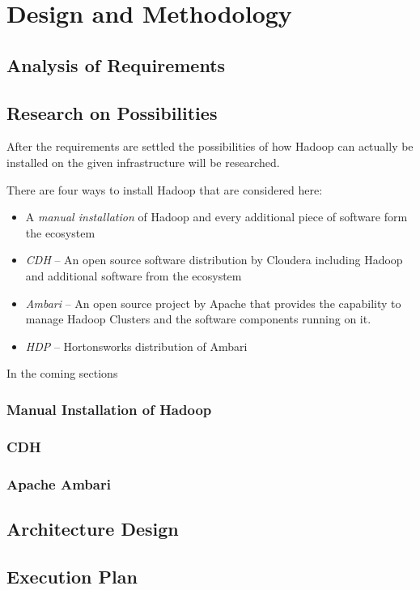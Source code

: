 \chapter{Design and Methodology}
\label{chap:design}

\section{Analysis of Requirements}

\section{Research on Possibilities}

After the requirements are settled
the possibilities of how Hadoop can actually be installed 
on the given infrastructure will be researched.

There are four ways to install Hadoop that are considered here:

\begin{itemize}
    \item A \emph{manual installation} of Hadoop 
        and every additional piece of software form the ecosystem
    \item \emph{\ac{CDH}} --  An open source software distribution by Cloudera including Hadoop
        and additional software from the ecosystem
    \item \emph{Ambari} -- An open source project by Apache that provides
        the capability to manage Hadoop Clusters and the software components running on it.
    \item \emph{\ac{HDP}} -- Hortonsworks distribution of Ambari
\end{itemize}

In the coming sections 

\subsection{Manual Installation of Hadoop}

\subsection{\acl{CDH}}

\subsection{Apache Ambari}

\section{Architecture Design}

\section{Execution Plan}
